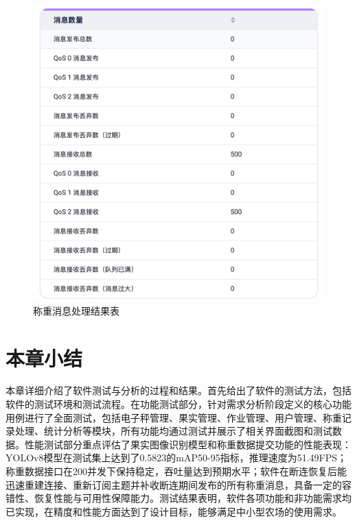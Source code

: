 \begin{figure}[H]
    \centering
    \includegraphics[width=0.8\linewidth]{../source/aws-test/net-stop-test-result.png}
    \caption{称重消息处理结果表}
    \label{fig:net-stop-test-result}
\end{figure}

\section{本章小结}

本章详细介绍了软件测试与分析的过程和结果。首先给出了软件的测试方法，包括软件的测试环境和测试流程。在功能测试部分，针对需求分析阶段定义的核心功能用例进行了全面测试，包括电子秤管理、果实管理、作业管理、用户管理、称重记录处理、统计分析等模块，所有功能均通过测试并展示了相关界面截图和测试数据。性能测试部分重点评估了果实图像识别模型和称重数据提交功能的性能表现：YOLOv8模型在测试集上达到了0.5823的mAP50-95指标，推理速度为51.49FPS；称重数据接口在200并发下保持稳定，吞吐量达到预期水平；软件在断连恢复后能迅速重建连接、重新订阅主题并补收断连期间发布的所有称重消息，具备一定的容错性、恢复性能与可用性保障能力。测试结果表明，软件各项功能和非功能需求均已实现，在精度和性能方面达到了设计目标，能够满足中小型农场的使用需求。
